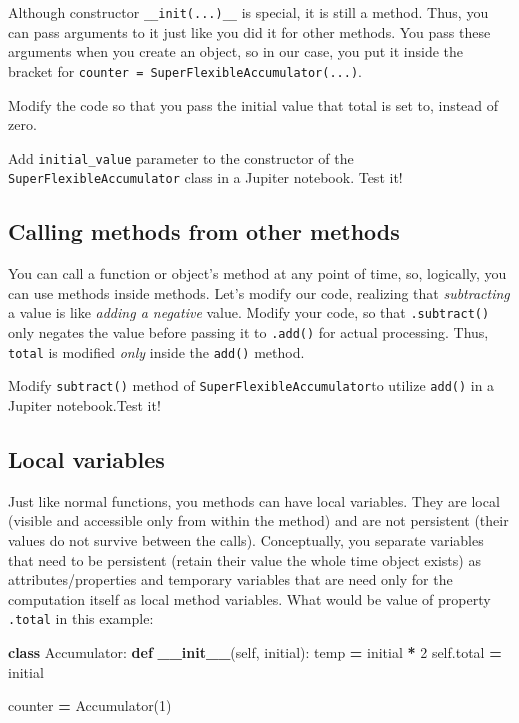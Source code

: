 \documentclass[
]{book}
\newenvironment{Shaded}{\begin{snugshade}}{\end{snugshade}}
\newcommand{\DecValTok}[1]{\textcolor[rgb]{0.00,0.00,0.81}{#1}}
\newcommand{\FunctionTok}[1]{\textcolor[rgb]{0.13,0.29,0.53}{\textbf{#1}}}
\newcommand{\KeywordTok}[1]{\textcolor[rgb]{0.13,0.29,0.53}{\textbf{#1}}}
\newcommand{\NormalTok}[1]{#1}
\newcommand{\OperatorTok}[1]{\textcolor[rgb]{0.81,0.36,0.00}{\textbf{#1}}}
\newcommand{\VariableTok}[1]{\textcolor[rgb]{0.00,0.00,0.00}{#1}}
\begin{document}
Although constructor \texttt{\_\_init(...)\_\_} is special, it is still a method. Thus, you can pass arguments to it just like you did it for other methods. You pass these arguments when you create an object, so in our case, you put it inside the bracket for \texttt{counter\ =\ SuperFlexibleAccumulator(...)}.

Modify the code so that you pass the initial value that total is set to, instead of zero.

Add \texttt{initial\_value} parameter to the constructor of the \texttt{SuperFlexibleAccumulator} class in a Jupiter notebook. Test it!

\hypertarget{calling-methods-from-other-methods}{%
\subsection{Calling methods from other methods}\label{calling-methods-from-other-methods}}

You can call a function or object's method at any point of time, so, logically, you can use methods inside methods. Let's modify our code, realizing that \emph{subtracting} a value is like \emph{adding a negative} value. Modify your code, so that \texttt{.subtract()} only negates the value before passing it to \texttt{.add()} for actual processing. Thus, \texttt{total} is modified \emph{only} inside the \texttt{add()} method.

Modify \texttt{subtract()} method of \texttt{SuperFlexibleAccumulator}to utilize \texttt{add()} in a Jupiter notebook.Test it!

\hypertarget{local-variables}{%
\subsection{Local variables}\label{local-variables}}

Just like normal functions, you methods can have local variables. They are local (visible and accessible only from within the method) and are not persistent (their values do not survive between the calls). Conceptually, you separate variables that need to be persistent (retain their value the whole time object exists) as attributes/properties and temporary variables that are need only for the computation itself as local method variables. What would be value of property \texttt{.total} in this example:

\begin{Shaded}
\begin{Highlighting}[]
\KeywordTok{class}\NormalTok{ Accumulator:}
    \KeywordTok{def} \FunctionTok{\_\_init\_\_}\NormalTok{(}\VariableTok{self}\NormalTok{, initial):}
\NormalTok{        temp }\OperatorTok{=}\NormalTok{ initial }\OperatorTok{*} \DecValTok{2}
        \VariableTok{self}\NormalTok{.total }\OperatorTok{=}\NormalTok{ initial}
        
\NormalTok{counter }\OperatorTok{=}\NormalTok{ Accumulator(}\DecValTok{1}\NormalTok{)}
\end{Highlighting}
\end{Shaded}
\end{document}
